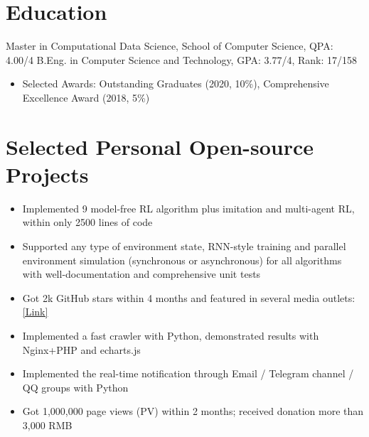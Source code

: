 \documentclass{resume}
\begin{document}



\section{Education}
Master in Computational Data Science, School of Computer Science, QPA: 4.00/4
B.Eng. in Computer Science and Technology, GPA: 3.77/4, Rank: 17/158
\begin{itemize}
    \item Selected Awards: Outstanding Graduates (2020, 10\%), Comprehensive Excellence Award (2018, 5\%)
\end{itemize}

\section{Selected Personal Open-source Projects}
\begin{itemize}
  \item Implemented 9 model-free RL algorithm plus imitation and multi-agent RL, within only 2500 lines of code
  \item Supported any type of environment state, RNN-style training and parallel environment simulation (synchronous or asynchronous) for all algorithms with well-documentation and comprehensive unit tests
  \item Got 2k GitHub stars within 4 months and featured in several media outlets: \href{https://www.jiqizhixin.com/articles/2020-03-31-7}{[Link]}
\end{itemize}

\begin{itemize}
  \item Implemented a fast crawler with Python, demonstrated results with Nginx+PHP and echarts.js
  \item Implemented the real-time notification through Email / Telegram channel / QQ groups with Python
  \item Got 1,000,000 page views (PV) within 2 months; received donation more than 3,000 RMB
\end{itemize}
\end{document}
